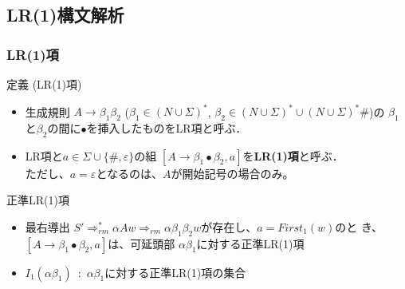 \documentclass[dvipdfmx,cjk]{beamer}
\begin{document}
\subsection{LR(1)構文解析}

\begin{frame}
  \frametitle{LR(1)項}
  \vspace*{-5pt}
  {\footnotesize
  \begin{itembox}[l]{定義 (LR(1)項)}
    \begin{itemize}\setlength{\itemsep}{1pt}\setlength{\topsep}{2pt}\setlength{\parsep}{0pt}
      \item 生成規則 $A\rightarrow\beta_1\beta_2$ ($\beta_1\in(N\cup\Sigma)^\ast$,
            $\beta_2\in(N\cup\Sigma)^\ast\cup(N\cup\Sigma)^\ast\#$)の
            $\beta_1$と$\beta_2$の間に$\bullet$を挿入したものをLR項と呼ぶ．

      \item
            LR項と$a\in\Sigma\cup\{\#,\varepsilon\}$の組
            $[A\rightarrow\beta_1\bullet\beta_2,a]$を{\bf LR(1)項}と呼ぶ．\\
            ただし、$a=\varepsilon$となるのは、$A$が開始記号の場合のみ。
    \end{itemize}
  \end{itembox}

  \vspace*{-2pt}

  \begin{itembox}[l]{正準LR(1)項}
    \begin{itemize}\setlength{\itemsep}{1pt}\setlength{\topsep}{2pt}\setlength{\parsep}{0pt}
      \item 最右導出 $S'\Rightarrow_{rm}^\ast\alpha A
              w\Rightarrow_{rm}\alpha\beta_1\beta_2 w$が存在し、$a=First_1(w)$のと
            き、$[A\rightarrow\beta_1\bullet\beta_2,a]$は、可延頭部
            $\alpha\beta_1$に対する正準LR(1)項
      \item
            $I_1(\alpha\beta_1)$\ :\ $\alpha\beta_1$に対する正準LR(1)項の集合
    \end{itemize}
  \end{itembox}}
\end{frame}
\end{document}
